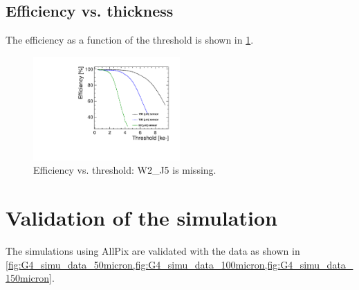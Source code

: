 \subsection{Efficiency vs. thickness}

The efficiency as a function of the threshold is shown in \cref{fig:efficiency_VS_Threshold}.

\begin{figure}[htbp] 
  \centering
  \includegraphics[width=0.5\textwidth]{./figures/TestBeam/Efficiency_vs_THL.pdf}
  \caption{Efficiency vs. threshold: W2\_J5 is missing.}
  \label{fig:efficiency_VS_Threshold}
\end{figure}


\section{Validation of the simulation}

The simulations using AllPix are validated with the data as shown in
\cref{fig:G4_simu_data_50micron,fig:G4_simu_data_100micron,fig:G4_simu_data_150micron}.

